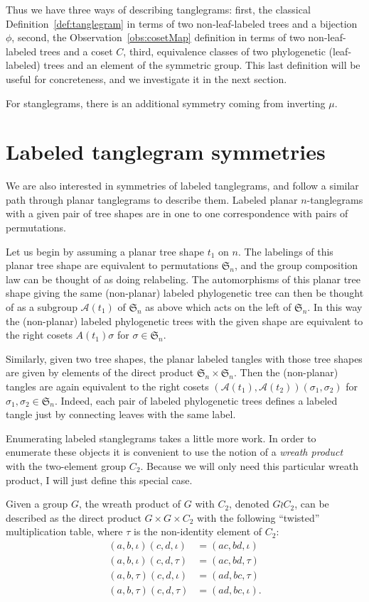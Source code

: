 \documentclass{amsart}
\newcommand{\fS}{\mathfrak S}
\newcommand{\aut}{\mathcal A}
\newcommand{\pairing}{\mu}
\newcommand{\id}{\iota}
\newcommand{\wrtwo}{\wr C_2}
\begin{document}
Thus we have three ways of describing tanglegrams:
first, the classical Definition~\ref{def:tanglegram} in terms of two non-leaf-labeled trees and a bijection $\phi$,
second, the Observation~\ref{obs:cosetMap} definition in terms of two non-leaf-labeled trees and a coset $C$,
third, equivalence classes of two phylogenetic (leaf-labeled) trees and an element of the symmetric group.
This last definition will be useful for concreteness, and we investigate it in the next section.

For stanglegrams, there is an additional symmetry coming from inverting $\pairing$.


\section{Labeled tanglegram symmetries}
We are also interested in symmetries of labeled tanglegrams, and follow a similar path through planar tanglegrams to describe them.
Labeled planar $n$-tanglegrams with a given pair of tree shapes are in one to one correspondence with pairs of permutations.

Let us begin by assuming a planar tree shape $t_1$ on $n$.
The labelings of this planar tree shape are equivalent to permutations $\fS_n$, and the group composition law can be thought of as doing relabeling.
The automorphisms of this planar tree shape giving the same (non-planar) labeled phylogenetic tree can then be thought of as a subgroup $\aut(t_1)$ of $\fS_n$ as above which acts on the left of $\fS_n$.
In this way the (non-planar) labeled phylogenetic trees with the given shape are equivalent to the right cosets $A(t_1) \sigma$ for $\sigma \in \fS_n$.

Similarly, given two tree shapes, the planar labeled tangles with those tree shapes are given by elements of the direct product $\fS_n \times \fS_n$.
Then the (non-planar) tangles are again equivalent to the right cosets $(\aut(t_1), \aut(t_2)) (\sigma_1, \sigma_2)$ for $\sigma_1, \sigma_2 \in \fS_n$.
Indeed, each pair of labeled phylogenetic trees defines a labeled tangle just by connecting leaves with the same label.

Enumerating labeled stanglegrams takes a little more work.
In order to enumerate these objects it is convenient to use the notion of a \emph{wreath product} with the two-element group $C_2$.
Because we will only need this particular wreath product, I will just define this special case.

Given a group $G$, the wreath product of $G$ with $C_2$, denoted $G \wrtwo$, can be described as the direct product $G \times G \times C_2$ with the following ``twisted'' multiplication table, where $\tau$ is the non-identity element of $C_2$:
\begin{align*}
(a, b, \id) (c, d, \id) & = (ac, bd, \id) \\
(a, b, \id) (c, d, \tau) & = (ac, bd, \tau) \\
(a, b, \tau) (c, d, \id) & = (ad, bc, \tau) \\
(a, b, \tau) (c, d, \tau) & = (ad, bc, \id).
\end{align*}
\end{document}
